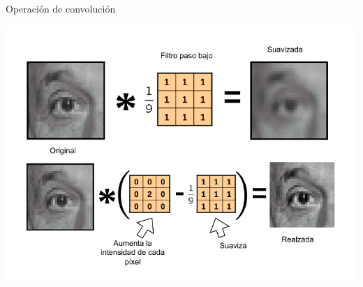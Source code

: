 \documentclass{beamer}
\begin{document}
\begin{frame}{Operación de convolución}
{    %

    \includegraphics[width=1\textwidth]{img/einstein.drawio.pdf} 
}
\end{frame}






\end{document}
